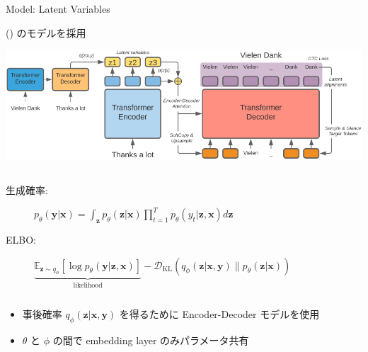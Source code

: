 \documentclass[unicode, 12pt, xdvipdfmx, aspectratio=43]{beamer}
\newcommand{\citet}[2][\footnotesize]{{\reffont#1\citeauthor*{#2} (\citeyear{#2})}}
\begin{document}
\begin{frame}[label={sec:org1345e82}]{Model: Latent Variables}
\begin{block}{\citet[\normalsize]{shu-etal-2020-latent} のモデルを採用}
\vspace{-0.4cm}
\begin{center}
\includegraphics[width=0.85\linewidth]{./figure/Figure3.pdf}
\end{center}

\begin{columns}
\begin{column}{1.1\columnwidth}
\vspace{-0.5cm}
\begin{description}
\item[{生成確率:}] \(p_\theta (\boldsymbol{y}|\boldsymbol{x}) = \int_{\boldsymbol{z}} p_\theta (\boldsymbol{z}|\boldsymbol{x}) \prod_{t=1}^T p_\theta (y_t | \boldsymbol{z}, \boldsymbol{x}) d\boldsymbol{z}\)
\item[{ELBO:}] \(\underbrace{\mathbb{E}_{\boldsymbol{z} \sim q_\phi} \left[ \log p_\theta (\boldsymbol{y} | \boldsymbol{z}, \boldsymbol{x}) \right]}_{\text{likelihood}} - \mathcal{D}_{\mathrm{KL}} (q_\phi (\boldsymbol{z} | \boldsymbol{x}, \boldsymbol{y} ) \parallel p_\theta ( \boldsymbol{z} | \boldsymbol{x}))\)
\end{description}
\end{column}
\end{columns}

\begin{block}{}
\vspace{-0.7cm}
\begin{itemize}
\item 事後確率 \(q_\phi (\boldsymbol{z} | \boldsymbol{x}, \boldsymbol{y} )\) を得るために Encoder-Decoder モデルを使用
\item \(\theta\) と \(\phi\) の間で embedding layer のみパラメータ共有
\end{itemize}
\end{block}
\end{block}
\end{frame}
\end{document}
